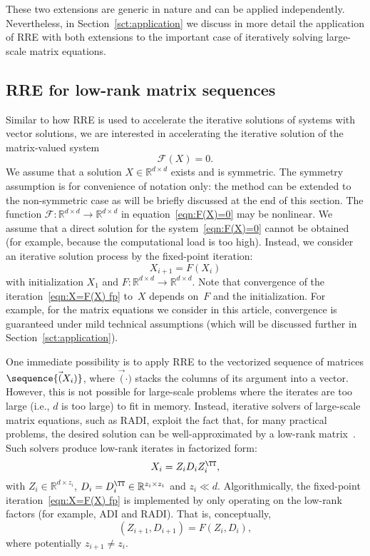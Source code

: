 These two extensions are generic in nature and can be applied independently.
Nevertheless, in Section~\ref{sct:application} we discuss in more detail the application of RRE with both extensions to the important case of iteratively solving large-scale matrix equations.

\subsection{RRE for low-rank matrix sequences}\label{sct:matrix_rre}
Similar to how \ac{RRE} is used to accelerate the iterative solutions of systems with vector solutions, we are interested in accelerating the iterative solution of the matrix-valued system
\begin{equation}
	\mathscr F(X) = 0.
	\label{eqn:F(X)=0}
\end{equation}
We assume that a solution $X \in \mathbb{R}^{d \times d}$ exists and is symmetric.
The symmetry assumption is for convenience of notation only: the method can be extended to the non-symmetric case as will be briefly discussed at the end of this section.
The function $\mathscr F: \mathbb{R}^{d \times d} \rightarrow \mathbb{R}^{d \times d}$ in equation~\eqref{eqn:F(X)=0} may be nonlinear.
We assume that a direct solution for the system~\eqref{eqn:F(X)=0} cannot be obtained (for example, because the computational load is too high).
Instead, we consider an iterative solution process by the fixed-point iteration:
\begin{equation}
	X_{i+1} = F(X_i)
	\label{eqn:X=F(X) fp}
\end{equation}
with initialization $X_1$ and $F: \mathbb{R}^{d \times d} \rightarrow \mathbb{R}^{d \times d}$.
Note that convergence of the iteration~\eqref{eqn:X=F(X) fp} to~$X$ depends on~$F$ and the initialization.
For example, for the matrix equations we consider in this article, convergence is guaranteed under mild technical assumptions (which will be discussed further in Section~\ref{sct:application}).

One immediate possibility is to apply \ac{RRE} to the vectorized sequence of matrices $\sequence{\vec(X_i)}$,
where $\vec(\cdot)$ stacks the columns of its argument into a vector.
However, this is not possible for large-scale problems where the iterates are too large (i.e., $d$ is too large) to fit in memory.
Instead, iterative solvers of large-scale matrix equations, such as RADI, exploit the fact that, for many practical problems, the desired solution can be well-approximated by a low-rank matrix~\cite{benner2016solution}.
Such solvers produce low-rank iterates in factorized form:
\begin{equation}
	X_i = Z_i D_i Z_i^\TT,
	\label{eqn:Xi_lr_decomp}
\end{equation}
with $Z_i \in \mathbb{R}^{d \times z_i}$, $D_i = D_i^\TT \in \mathbb{R}^{z_i \times z_i}$ and $z_i \ll d$.
Algorithmically, the fixed-point iteration~\eqref{eqn:X=F(X) fp} is implemented by only operating on the low-rank factors (for example, \ac{ADI} and RADI).
That is, conceptually,
\begin{equation}
	(Z_{i+1}, D_{i+1}) = F(Z_i, D_i)
	,
	\label{eqn:X=F(X) lr}
\end{equation}
where potentially $z_{i+1} \neq z_i$.

